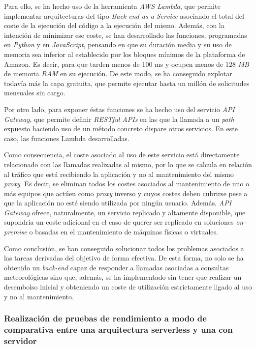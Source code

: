 \documentclass[11pt,spanish,listoffigures]{tfgetsinf}
\begin{document}
Para ello, se ha hecho uso de la herramienta \textit{AWS Lambda}, que permite implementar arquitecturas del tipo \textit{Back-end as a Service} asociando el total del coste de la ejecución del código a la ejecución del mismo. Además, con la intención de minimizar ese coste, se han desarrollado las funciones, programadas en \textit{Python} y en \textit{JavaScript}, pensando en que su duración media y su uso de memoria sea inferior al establecido por los bloques mínimos de la plataforma de Amazon. Es decir, para que tarden menos de 100 ms y ocupen menos de 128 \textit{MB} de memoria \textit{RAM} en su ejecución. De este modo, se ha conseguido explotar todavía más la capa gratuita, que permite ejecutar hasta un millón de solicitudes mensuales sin cargo.

Por otro lado, para exponer éstas funciones se ha hecho uso del servicio \textit{API Gateway}, que permite definir \textit{RESTful APIs} en las que la llamada a un \textit{path} expuesto haciendo uso de un método concreto dispare otros servicios. En este caso, las funciones Lambda desarrolladas. 

Como consecuencia, el coste asociado al uso de este servicio está directamente relacionado con las llamadas realizadas al mismo, por lo que se calcula en relación al tráfico que está recibiendo la aplicación y no al mantenimiento del mismo \textit{proxy}. Es decir, se eliminan todos los costes asociados al mantenimiento de uno o más equipos que actúen como \textit{proxy} inverso y cuyos costes deben cubrirse pese a que la aplicación no esté siendo utilizada por ningún usuario. Además, \textit{API Gateway} ofrece, naturalmente, un servicio replicado y altamente disponible, que supondría un coste adicional en el caso de querer ser replicado en soluciones \textit{on-premise} o basadas en el mantenimiento de máquinas físicas o virtuales.

Como conclusión, se han conseguido solucionar todos los problemas asociados a las tareas derivadas del objetivo de forma efectiva. De esta forma, no solo se ha obtenido un \textit{back-end} capaz de responder a llamadas asociadas a consultas meteorológicas sino que, además, se ha implementado sin tener que realizar un desembolso inicial y obteniendo un coste de utilización estrictamente ligado al uso y no al mantenimiento.

\subsubsection{Realización de pruebas de rendimiento a modo de comparativa entre una arquitectura serverless y una con servidor}
\end{document}
